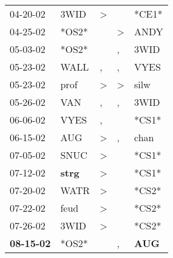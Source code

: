 \begin{supertabular}{p{0.07\textwidth}p{0.06\textwidth}p{0.02\textwidth}p{0.02\textwidth}p{0.06\textwidth}}
          04-20-02\textsuperscript{} &           3WID\textsuperscript{} &     \textgreater &                  &                            *CE1* \\
          04-25-02\textsuperscript{} &                            *OS2* &                  &     \textgreater &           ANDY\textsuperscript{} \\
          05-03-02\textsuperscript{} &                            *OS2* &                  &                , &           3WID\textsuperscript{} \\
          05-23-02\textsuperscript{} &           WALL\textsuperscript{} &                , &                , &           VYES\textsuperscript{} \\
          05-23-02\textsuperscript{} &           prof\textsuperscript{} &     \textgreater &     \textgreater &           silw\textsuperscript{} \\
          05-26-02\textsuperscript{} &            VAN\textsuperscript{} &                , &                , &           3WID\textsuperscript{} \\
          06-06-02\textsuperscript{} &           VYES\textsuperscript{} &                , &                  &                            *CS1* \\
          06-15-02\textsuperscript{} &            AUG\textsuperscript{} &     \textgreater &                , &           chan\textsuperscript{} \\
          07-05-02\textsuperscript{} &           SNUC\textsuperscript{} &     \textgreater &                  &                            *CS1* \\
          07-12-02\textsuperscript{} &  \textbf{strg\textsuperscript{}} &     \textgreater &                  &                            *CS1* \\
          07-20-02\textsuperscript{} &           WATR\textsuperscript{} &     \textgreater &                  &                            *CS2* \\
          07-22-02\textsuperscript{} &           feud\textsuperscript{} &     \textgreater &                  &                            *CS2* \\
          07-26-02\textsuperscript{} &           3WID\textsuperscript{} &     \textgreater &                  &                            *CS2* \\
 \textbf{08-15-02\textsuperscript{}} &                            *OS2* &                  &                , &   \textbf{AUG\textsuperscript{}} \\

\end{supertabular}
